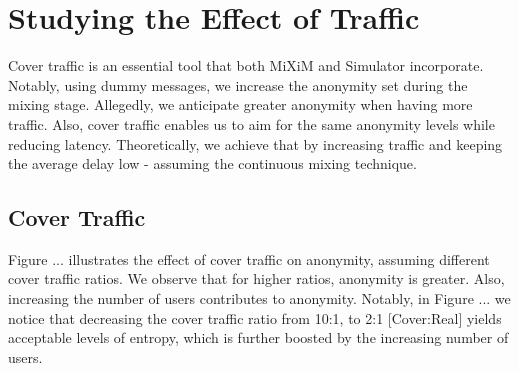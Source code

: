 \documentclass[logo,msc,cyber]{infthesis}   %
\begin{document}
\section{Studying the Effect of Traffic}

Cover traffic is an essential tool that both MiXiM and Simulator incorporate.
Notably, using dummy messages, we increase the anonymity set during the mixing
stage. Allegedly, we anticipate greater anonymity when having more traffic.
Also, cover traffic enables us to aim for the same anonymity levels while
reducing latency. Theoretically, we achieve that by increasing traffic and
keeping the average delay low - assuming the continuous mixing technique. 

\subsection{Cover Traffic}

Figure ... illustrates the effect of cover traffic on anonymity, assuming
different cover traffic ratios. We observe that for higher ratios, anonymity is
greater. Also, increasing the number of users contributes to anonymity. Notably,
in Figure ... we notice that decreasing the cover traffic ratio from 10:1,  to
2:1 [Cover:Real] yields acceptable levels of entropy, which is further boosted
by the increasing number of users. 
\end{document}
